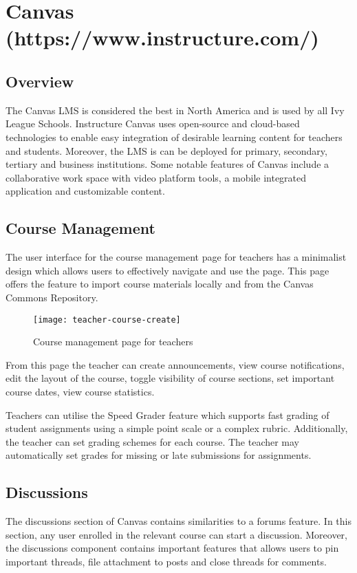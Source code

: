 \section{Canvas (https://www.instructure.com/)}

\subsection{Overview}
The Canvas LMS is considered the best in North America and is used by all Ivy League Schools\cite{canvasLMS}. Instructure 
Canvas uses open-source and cloud-based technologies to enable easy integration of desirable learning content 
for teachers and students. Moreover, the LMS is can be deployed for primary, secondary, tertiary and business 
institutions. Some notable features of Canvas include a collaborative work space with video platform tools, a 
mobile integrated application and customizable content.

\subsection{Course Management}
The user interface for the course management page for teachers has a minimalist design which allows users to 
effectively navigate and use the page. This page offers the feature to import course materials locally and 
from the Canvas Commons Repository.

\begin{figure}[h!]
\texttt{[image: teacher-course-create]}
\centering
\caption{Course management page for teachers}
\end{figure}

From this page the teacher can create announcements, view course notifications, edit the layout of the course, toggle 
visibility of course sections, set important course dates, view course statistics.

Teachers can utilise the Speed Grader feature which supports fast grading of student assignments using a simple point 
scale or a complex rubric. Additionally, the teacher can set grading schemes for each course. The teacher may 
automatically set grades for missing or late submissions for assignments. 

\subsection{Discussions}
The discussions section of Canvas contains similarities to a forums feature. In this section, any user enrolled in 
the relevant course can start a discussion. Moreover, the discussions component contains important features that 
allows users to pin important threads, file attachment to posts and close threads for comments.


